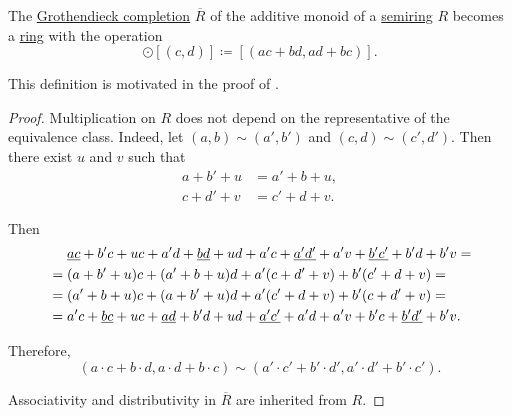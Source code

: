 \begin{proposition}\label{thm:grothendieck_semiring_completion}
  The \hyperref[def:monoid_grothendieck_completion]{Grothendieck completion} \( \overline{R} \) of the additive monoid of a \hyperref[def:semiring]{semiring} \( R \) becomes a \hyperref[def:ring]{ring} with the operation
  \begin{equation*}
    [(a, b)] \odot [(c, d)] \coloneqq [(ac + bd, ad + bc)].
  \end{equation*}

  This definition is motivated in the proof of .
\end{proposition}
\begin{proof}
  Multiplication on \( R \) does not depend on the representative of the equivalence class. Indeed, let \( (a, b) \sim (a', b') \) and \( (c, d) \sim (c', d') \). Then there exist \( u \) and \( v \) such that
  \begin{align*}
    a + b' + u &= a' + b + u, \\
    c + d' + v &= c' + d + v.
  \end{align*}

  Then
  \begin{align*}
    &\phantom{{}={}}
    \hi{ac} + b'c + uc + a'd + \hi{bd} + ud + a'c + \hi{a'd'} + a'v + \hi{b'c'} + b'd + b'v
    = \\ &=
    (a + b' + u)c + (a' + b + u)d + a'(c + d' + v) + b'(c' + d + v)
    = \\ &=
    (a' + b + u)c + (a + b' + u)d + a'(c' + d + v) + b'(c + d' + v)
    = \\ &=
    a'c + \hi{bc} + uc + \hi{ad} + b'd + ud + \hi{a'c'} + a'd + a'v + b'c + \hi{b'd'} + b'v.
  \end{align*}

  Therefore,
  \begin{equation*}
    (a \cdot c + b \cdot d, a \cdot d + b \cdot c) \sim (a' \cdot c' + b' \cdot d', a' \cdot d' + b' \cdot c').
  \end{equation*}

  Associativity and distributivity in \( \overline{R} \) are inherited from \( R \).
\end{proof}

